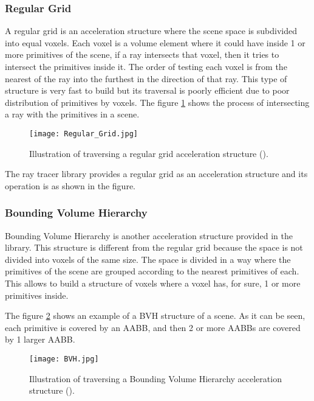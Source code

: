 \subsubsection{Regular Grid}

\par
A regular grid is an acceleration structure where the scene space is subdivided into equal voxels.
Each voxel is a volume element where it could have inside 1 or more primitives of the scene, if a ray intersects that voxel, then it tries to intersect the primitives inside it.
The order of testing each voxel is from the nearest of the ray into the furthest in the direction of that ray.
This type of structure is very fast to build but its traversal is poorly efficient due to poor distribution of primitives by voxels.
The figure \ref{RegularGrid.} shows the process of intersecting a ray with the primitives in a scene.

\begin{figure}[H]
	\centering
	\caption{Illustration of traversing a regular grid acceleration structure (\cite{RegularGrid}).}
	\label{RegularGrid.}
	\texttt{[image: Regular\_Grid.jpg]}
\end{figure}

\par
The ray tracer library provides a regular grid as an acceleration structure and its operation is as shown in the figure.

\subsubsection{Bounding Volume Hierarchy}

\par
Bounding Volume Hierarchy is another acceleration structure provided in the library.
This structure is different from the regular grid because the space is not divided into voxels of the same size.
The space is divided in a way where the primitives of the scene are grouped according to the nearest primitives of each.
This allows to build a structure of voxels where a voxel has, for sure, 1 or more primitives inside.

\par
The figure \ref{BVH.} shows an example of a BVH structure of a scene.
As it can be seen, each primitive is covered by an AABB, and then 2 or more AABBs are covered by 1 larger AABB.

\begin{figure}[H]
	\centering
	\caption{Illustration of traversing a Bounding Volume Hierarchy acceleration structure (\cite{BVH}).}
	\label{BVH.}
	\texttt{[image: BVH.jpg]}
\end{figure}

